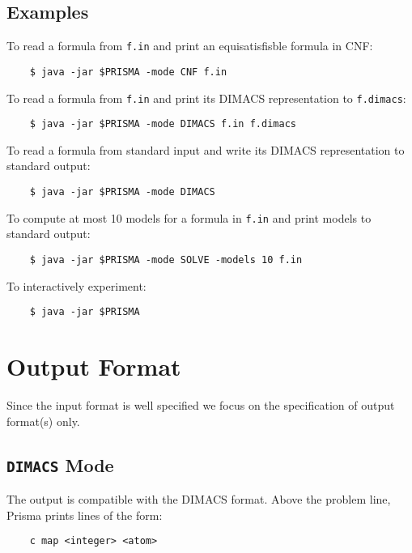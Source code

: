 \documentclass{llncs}
\begin{document}
\begin{enumerate}
\subsection{Examples}

To read a formula from \texttt{f.in} and print an equisatisfisble formula in CNF:

	\begin{verbatim}
	$ java -jar $PRISMA -mode CNF f.in
	\end{verbatim}

To read a formula from \texttt{f.in} and print its DIMACS representation to \texttt{f.dimacs}:

	\begin{verbatim}
	$ java -jar $PRISMA -mode DIMACS f.in f.dimacs
	\end{verbatim}


To read a formula from standard input and write its DIMACS representation to standard output:

	\begin{verbatim}
	$ java -jar $PRISMA -mode DIMACS
	\end{verbatim}
	
To compute at most 10 models for a formula in \texttt{f.in} and print models to standard output:

	\begin{verbatim}
	$ java -jar $PRISMA -mode SOLVE -models 10 f.in
	\end{verbatim}

To interactively experiment:

	\begin{verbatim}
	$ java -jar $PRISMA
	\end{verbatim}
	
\section{Output Format}
\label{sec:output}

Since the input format is well specified we focus on the specification of output format(s) only.

\subsection{\texttt{DIMACS} Mode}

The output is compatible with the DIMACS format. Above the problem line, Prisma prints lines of the form:

	\begin{verbatim}
	c map <integer> <atom>
	\end{verbatim}


\end{enumerate}
\end{document}
